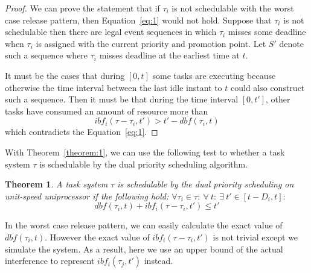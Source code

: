 \documentclass[12pt,conference,twocolumn]{IEEEtran}
\newtheorem{theorem}{Theorem}
\newtheorem{proof}{Proof}
\newtheorem{example}{Example}
\begin{document}
\begin{proof}
We can prove the statement that if $\tau_i$ is not schedulable with the worst case release pattern, then Equation~\ref{eq:1} would not hold. Suppose that $\tau_i$ is not schedulable then there are legal event sequences in which $\tau_i$ misses some deadline when $\tau_i$ is assigned with the current priority and promotion point. Let $S'$ denote such a sequence where $\tau_i$ misses deadline at the earliest time at $t$.

It must be the cases that during $[0,t]$ some tasks are executing because otherwise the time interval between the last idle instant to $t$ could also construct such a sequence. Then it must be that during the time interval $[0,t']$, other tasks have consumed an amount of resource more than 
\[
ibf_i(\tau-\tau_i,t')>t'-dbf(\tau_i,t)
\]
which contradicts the Equation~\ref{eq:1}.
\end{proof}
With Theorem~\ref{theorem:1}, we can use the following test to whether a task system $\tau$ is schedulable by the dual priority scheduling algorithm.
\begin{theorem}
A task system $\tau$ is schedulable by the dual priority scheduling on unit-speed uniprocessor if the following hold: $\forall \tau_i\in \tau:~\forall~t:~\exists~t'\in[t-D_i, t]:~$
\begin{equation}
dbf(\tau_i,t)+ibf_i(\tau-\tau_i,t')\leq t'
\end{equation}
\end{theorem}



In the worst case release pattern, we can easily calculate the exact value of $dbf(\tau_i,t)$. However the exact value of $ibf_i(\tau-\tau_i,t')$ is not trivial except we simulate the system.  As a result, here we use an upper bound of the actual interference to represent  $ibf_i(\tau_j,t')$ instead.





\end{document}
